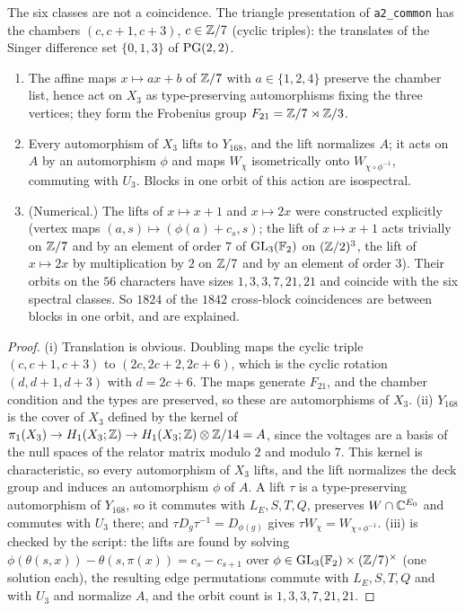 The six classes are not a coincidence. The triangle presentation of \texttt{a2\_common} has the
chambers $(c,c+1,c+3)$, $c\in\mathbb{Z}/7$ (cyclic triples): the translates of the Singer difference set
$\{0,1,3\}$ of $\mathrm{PG}(2,2)$.

\begin{proposition}\label{V3P4:prop:aut}
\begin{enumerate}
\item[(i)] The affine maps $x\mapsto ax+b$ of $\mathbb{Z}/7$ with $a\in\{1,2,4\}$ preserve the chamber
list, hence act on $X_3$ as type-preserving automorphisms fixing the three vertices; they form
the Frobenius group $F_{21}=\mathbb{Z}/7\rtimes\mathbb{Z}/3$.
\item[(ii)] Every automorphism of $X_3$ lifts to $Y_{168}$, and the lift normalizes $A$; it acts
on $A$ by an automorphism $\phi$ and maps $W_\chi$ isometrically onto $W_{\chi\circ\phi^{-1}}$,
commuting with $U_3$. Blocks in one orbit of this action are isospectral.
\item[(iii)] (Numerical.) The lifts of $x\mapsto x+1$ and $x\mapsto2x$ were constructed
explicitly (vertex maps $(a,s)\mapsto(\phi(a)+c_s,s)$; the lift of $x\mapsto x+1$ acts trivially on
$\mathbb{Z}/7$ and by an element of order $7$ of $\mathrm{GL}_3(\mathbb{F}_2)$ on $(\mathbb{Z}/2)^{3}$, the lift of
$x\mapsto2x$ by multiplication by $2$ on $\mathbb{Z}/7$ and by an element of order $3$). Their orbits on
the $56$ characters have sizes $1,3,3,7,21,21$ and coincide with the six spectral classes. So
$1824$ of the $1842$ cross-block coincidences are between blocks in one orbit, and are explained.
\end{enumerate}
\end{proposition}

\begin{proof}
(i) Translation is obvious. Doubling maps the cyclic triple $(c,c+1,c+3)$ to $(2c,2c+2,2c+6)$,
which is the cyclic rotation $(d,d+1,d+3)$ with $d=2c+6$. The maps generate $F_{21}$, and the
chamber condition and the types are preserved, so these are automorphisms of $X_3$.
(ii) $Y_{168}$ is the cover of $X_3$ defined by the kernel of
$\pi_1(X_3)\to H_1(X_3;\mathbb{Z})\to H_1(X_3;\mathbb{Z})\otimes\mathbb{Z}/14=A$, since the voltages are a basis of the
null spaces of the relator matrix modulo $2$ and modulo $7$. This kernel is characteristic, so
every automorphism of $X_3$ lifts, and the lift normalizes the deck group and induces an
automorphism $\phi$ of $A$. A lift $\tau$ is a type-preserving automorphism of $Y_{168}$, so it
commutes with $L_E,S,T,Q$, preserves $W\cap\mathbb{C}^{E_0}$ and commutes with $U_3$ there; and
$\tau D_g\tau^{-1}=D_{\phi(g)}$ gives $\tau W_\chi=W_{\chi\circ\phi^{-1}}$. (iii) is checked by
the script: the lifts are found by solving $\phi(\theta(s,x))-\theta(s,\pi(x))=c_s-c_{s+1}$
over $\phi\in\mathrm{GL}_3(\mathbb{F}_2)\times(\mathbb{Z}/7)^{\times}$ (one solution each), the resulting edge permutations
commute with $L_E,S,T,Q$ and with $U_3$ and normalize $A$, and the orbit count is $1,3,3,7,21,21$.
\end{proof}

